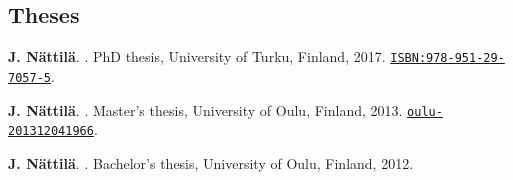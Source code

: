 \documentclass[10pt]{article}
\begin{document}
\subsection*{\phantom{sub} Theses}

\vspace{-20pt}
%
\begin{thebibliography}{3}
\vspace{-5pt}

\textbf{J. N\"attil\"a}.
.
\newblock PhD thesis, University of Turku, Finland, 2017. \href{http://urn.fi/URN:ISBN:978-951-29-7057-5}{\nolinkurl{ISBN:978-951-29-7057-5}}.

\textbf{J. N\"attil\"a}.
.
\newblock Master's thesis, University of Oulu, Finland, 2013. \href{http://urn.fi/URN:NBN:fi:oulu-201312041966}{\nolinkurl{oulu-201312041966}}.

\textbf{J. N\"attil\"a}.
.
\newblock Bachelor's thesis, University of Oulu, Finland, 2012.

\end{thebibliography}
\end{document}
